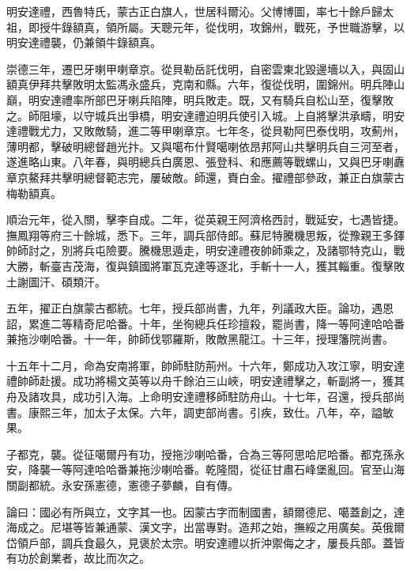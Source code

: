 \begin{pinyinscope}
明安達禮，西魯特氏，蒙古正白旗人，世居科爾沁。父博博圖，率七十餘戶歸太祖，即授牛錄額真，領所屬。天聰元年，從伐明，攻錦州，戰死，予世職游擊，以明安達禮襲，仍兼領牛錄額真。

崇德三年，遷巴牙喇甲喇章京。從貝勒岳託伐明，自密雲東北毀邊墻以入，與固山額真伊拜共擊敗明太監馮永盛兵，克南和縣。六年，復從伐明，圍錦州。明兵陣山巔，明安達禮率所部巴牙喇兵陷陣，明兵敗走。既，又有騎兵自松山至，復擊敗之。師阻壕，以守城兵出爭橋，明安達禮迫明兵使引入城。上自將擊洪承疇，明安達禮戰尤力，又敗敵騎，進二等甲喇章京。七年冬，從貝勒阿巴泰伐明，攻薊州，薄明都，擊破明總督趙光抃。又與噶布什賢噶喇依昂邦阿山共擊明兵自三河至者，遂進略山東。八年春，與明總兵白廣恩、張登科、和應薦等戰螺山，又與巴牙喇纛章京鰲拜共擊明總督範志完，屢破敵。師還，賚白金。擢禮部參政，兼正白旗蒙古梅勒額真。

順治元年，從入關，擊李自成。二年，從英親王阿濟格西討，戰延安，七遇皆捷。撫鳳翔等府三十餘城，悉下。三年，調兵部侍郎。蘇尼特騰機思叛，從豫親王多鐸帥師討之，別將兵屯險要。騰機思遁走，明安達禮夜帥師乘之，及諸鄂特克山，戰大勝，斬臺吉茂海，復與鎮國將軍瓦克達等逐北，手斬十一人，獲其輜重。復擊敗土謝圖汗、碩類汗。

五年，擢正白旗蒙古都統。七年，授兵部尚書，九年，列議政大臣。論功，遇恩詔，累進二等精奇尼哈番。十年，坐徇總兵任珍擅殺，罷尚書，降一等阿達哈哈番兼拖沙喇哈番。十一年，帥師伐鄂羅斯，敗敵黑龍江。十三年，授理籓院尚書。

十五年十二月，命為安南將軍，帥師駐防荊州。十六年，鄭成功入攻江寧，明安達禮帥師赴援。成功將楊文英等以舟千餘泊三山峽，明安達禮擊之，斬副將一，獲其舟及諸攻具，成功引入海。上命明安達禮移師駐防舟山。十七年，召還，授兵部尚書。康熙三年，加太子太保。六年，調吏部尚書。引疾，致仕。八年，卒，謚敏果。

子都克，襲。從征噶爾丹有功，授拖沙喇哈番，合為三等阿思哈尼哈番。都克孫永安，降襲一等阿達哈哈番兼拖沙喇哈番。乾隆間，從征甘肅石峰堡亂回。官至山海關副都統。永安孫憲德，憲德子夢麟，自有傳。

論曰：國必有所與立，文字其一也。因蒙古字而制國書，額爾德尼、噶蓋創之，達海成之。尼堪等皆兼通蒙、漢文字，出當專對。造邦之始，撫綏之用廣矣。英俄爾岱領戶部，調兵食最久，見褒於太宗。明安達禮以折沖禦侮之才，屢長兵部。蓋皆有功於創業者，故比而次之。


\end{pinyinscope}